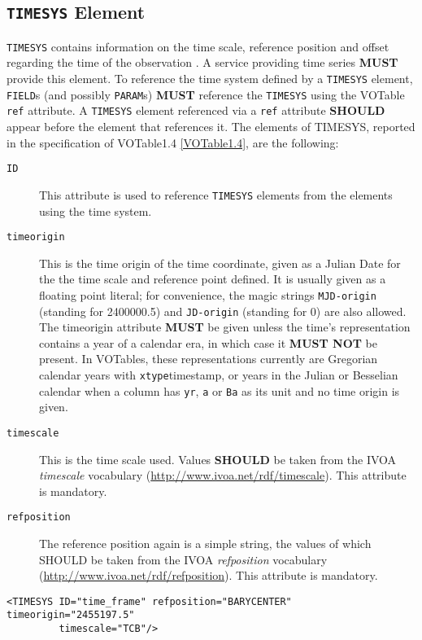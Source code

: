 \documentclass[11pt,a4paper]{ivoa}
\let\fg=\color
\def\attr#1{{\tt{\fg{DarkRed}#1}}}
\def\elem#1{{\tt{\fg{DarkRed}#1}}}
\begin{document}
\subsection{\elem{TIMESYS} Element}
\elem{TIMESYS} contains information on the time scale, reference position and offset regarding the time of the observation \cite{VOTable1.4, TIMESYS}. A service providing time series \textbf{MUST} provide this element. To reference the time system defined by a \elem{TIMESYS} element, \elem{FIELD}s (and possibly \elem{PARAM}s) \textbf{MUST} reference the \elem{TIMESYS} using the VOTable \attr{ref} attribute. A \elem{TIMESYS} element referenced via a \attr{ref} attribute \textbf{SHOULD} appear before the element that references it.  The elements of TIMESYS, reported in the specification of VOTable1.4 \ref{VOTable1.4}, are the following:
\begin{description}
   \item[\attr{ID}] This attribute is used to reference \elem{TIMESYS} elements from the elements using the time system.
   \item[\attr{timeorigin}] This is the time origin of the time coordinate, given as a Julian Date for the the time scale and reference point
defined.  It is usually given as a floating point literal; for convenience, the magic strings \verb|MJD-origin| (standing
for 2400000.5) and \verb|JD-origin| (standing for 0) are also allowed. The timeorigin attribute \textbf{MUST} be given unless the time's representation contains a year of a calendar era, in which case it \textbf{MUST NOT} be present. In VOTables, these representations currently are Gregorian calendar years with \elem{xtype}{timestamp}, or years in the Julian or Besselian calendar when a column has \verb|yr|, \verb|a| or \verb|Ba| as its unit and no time origin is given. 
   \item[\attr{timescale}] This is the time scale used. Values \textbf{SHOULD} be taken from the IVOA \emph{timescale} vocabulary (\url{http://www.ivoa.net/rdf/timescale}). This attribute is mandatory.
   \item[\attr{refposition}] The reference position again is a simple string, the values of which SHOULD be taken from the IVOA \emph{refposition} vocabulary (\url{http://www.ivoa.net/rdf/refposition}). This attribute is mandatory.
\end{description}

\noindent
\begingroup\footnotesize
\begin{tcolorbox}
\begin{verbatim}
<TIMESYS ID="time_frame" refposition="BARYCENTER" timeorigin="2455197.5"
         timescale="TCB"/>
\end{verbatim}
\end{tcolorbox}
\endgroup
\end{document}
